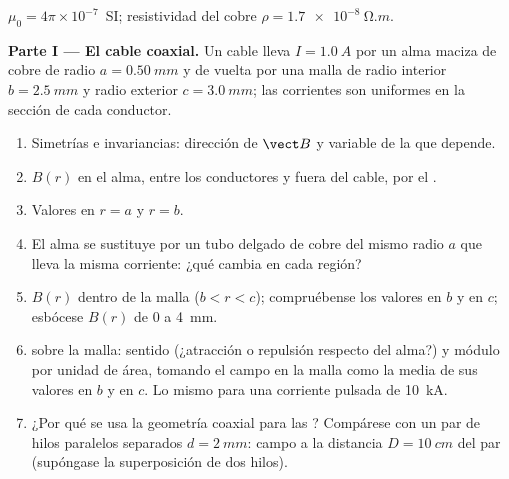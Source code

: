 \begin{problem}
\label{pb:b1:magnetostatics:1}
$\mu_0 = 4\pi \times 10^{-7}$~SI; resistividad del cobre $\rho = \qty{1.7e-8}{\ohm.m}$.

\medskip
\noindent\textbf{Parte I --- El cable coaxial.}
Un cable lleva $I = \qty{1.0}{A}$ por un alma maciza de cobre de radio
$a = \qty{0.50}{mm}$ y de vuelta por una malla de radio interior $b =
\qty{2.5}{mm}$ y radio exterior $c = \qty{3.0}{mm}$; las corrientes son
uniformes en la sección de cada conductor.
\begin{enumerate}
  \item Simetrías e invariancias: dirección de $\vect B$ y variable de la
        que depende.
  \item $B(r)$ en el alma, entre los conductores y fuera del cable, por el
        .
  \item Valores en $r = a$ y $r = b$.
  \item El alma se sustituye por un tubo delgado de cobre del mismo radio
        $a$ que lleva la misma corriente: ¿qué cambia en cada región?
  \item $B(r)$ dentro de la malla ($b < r < c$); compruébense los valores
        en $b$ y en $c$; esbócese $B(r)$ de $0$ a \qty{4}{mm}.
  \item {} sobre la malla: sentido (¿atracción o repulsión
        respecto del alma?) y módulo por unidad de área, tomando el campo
        en la malla como la media de sus valores en $b$ y en $c$.
        Lo mismo para una corriente pulsada de \qty{10}{kA}.
  \item ¿Por qué se usa la geometría coaxial para las ? Compárese
        con un par de hilos paralelos separados $d = \qty{2}{mm}$: campo a
        la distancia $D = \qty{10}{cm}$ del par (supóngase la superposición de dos hilos).
\end{enumerate}


\end{problem}
